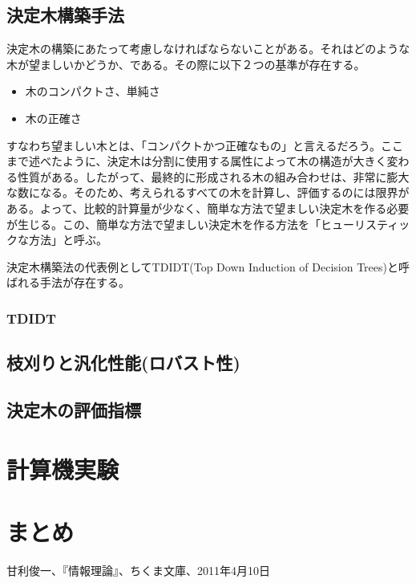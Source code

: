 \documentclass[dvipdfmx]{jsarticle}
\begin{document}
\subsection{決定木構築手法}
決定木の構築にあたって考慮しなければならないことがある。それはどのような木が望ましいかどうか、である。その際に以下２つの基準が存在する。
\begin{itemize}
  \item 木のコンパクトさ、単純さ
  \item 木の正確さ
\end{itemize}
すなわち望ましい木とは、「コンパクトかつ正確なもの」と言えるだろう。ここまで述べたように、決定木は分割に使用する属性によって木の構造が大きく変わる性質がある。したがって、最終的に形成される木の組み合わせは、非常に膨大な数になる。そのため、考えられるすべての木を計算し、評価するのには限界がある。よって、比較的計算量が少なく、簡単な方法で望ましい決定木を作る必要が生じる。この、簡単な方法で望ましい決定木を作る方法を「ヒューリスティックな方法」と呼ぶ。\par
決定木構築法の代表例としてTDIDT(Top Down Induction of Decision Trees)と呼ばれる手法が存在する。
\subsubsection{TDIDT}



\subsection{枝刈りと汎化性能(ロバスト性)}
\subsection{決定木の評価指標}


\section{計算機実験}
\section{まとめ}
\begin{thebibliography}{99}
   甘利俊一、『情報理論』、ちくま文庫、2011年4月10日
\end{thebibliography}
\end{document}
